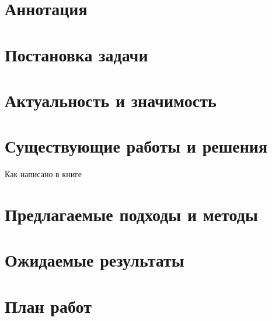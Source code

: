 

\section*{Аннотация}

\section{Постановка задачи}

\section{Актуальность и значимость}

\section{Существующие работы и решения}

Как написано в книге


\section{Предлагаемые подходы и методы} 

\section{Ожидаемые результаты}

\section{План работ}